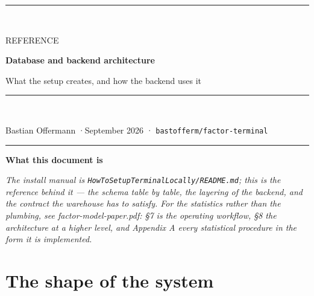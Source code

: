 \documentclass[11pt,a4paper]{article}
\newcommand{\code}[1]{\texttt{\small #1}}
\newenvironment{designnote}[1]
  {\par\vspace{1.6ex}%
   \begin{lrbox}{\notebox}\begin{minipage}{\textwidth}%
   {\color{rule}\rule{\textwidth}{0.4pt}}\par\vspace{0.7ex}
   {\small\sffamily\bfseries\color{navy}#1}\par\vspace{0.35ex}
   \small\itshape}
  {\par\vspace{0.7ex}\noindent{\color{rule}\rule{\textwidth}{0.4pt}}%
   \end{minipage}\end{lrbox}%
   \noindent\usebox{\notebox}\par\vspace{1.6ex}}
\begin{document}
\thispagestyle{empty}
\vspace*{0.4cm}
{\raggedright
{\color{rule}\rule{\textwidth}{0.8pt}}\\[1.8ex]
{\sffamily\footnotesize\color{brick}\MakeUppercase{Reference}\par}
\vspace{0.8ex}
{\sffamily\LARGE\bfseries\color{navy} Database and backend architecture\par}
\vspace{1.0ex}
{\sffamily\large\color{ink} What the setup creates, and how the backend uses it\par}
\vspace{1.6ex}
{\color{rule}\rule{\textwidth}{0.8pt}}\\[1.8ex]
{\small Bastian Offermann \quad·\quad September 2026 \quad·\quad
 \code{bastofferm/factor-terminal}\par}
}

\vspace{2.0ex}

\begin{designnote}{What this document is}
The install manual is \code{HowToSetupTerminalLocally/README.md}; this is the
reference behind it --- the schema table by table, the layering of the backend,
and the contract the warehouse has to satisfy. For the statistics rather than the
plumbing, see \emph{factor-model-paper.pdf}: §7 is the operating workflow, §8 the
architecture at a higher level, and Appendix A every statistical procedure in the
form it is implemented.
\end{designnote}

\vspace{0.6ex}
{\hypersetup{linkcolor=ink}\small\tableofcontents}

\newpage

\section{The shape of the system}
\label{sec:shape}
\end{document}

